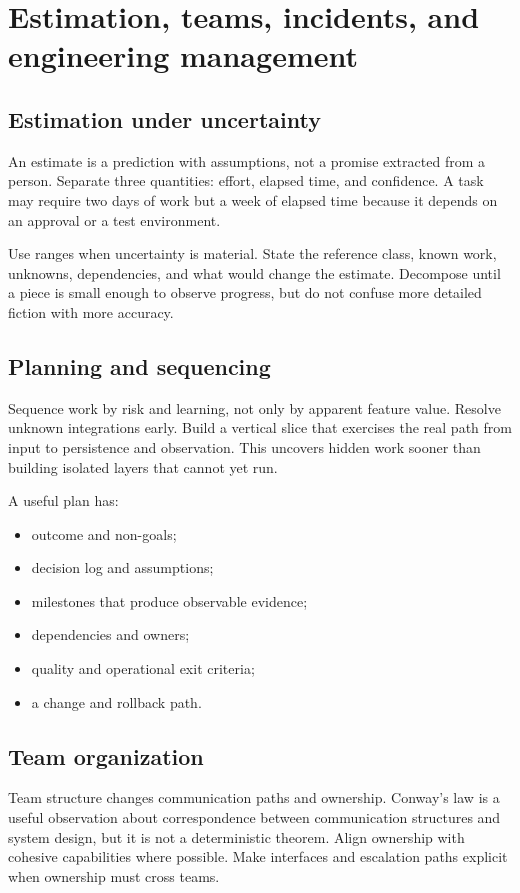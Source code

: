 \chapter{Estimation, teams, incidents, and engineering management}

\section{Estimation under uncertainty}
An estimate is a prediction with assumptions, not a promise extracted from a
person. Separate three quantities: effort, elapsed time, and confidence. A task
may require two days of work but a week of elapsed time because it depends on an
approval or a test environment.

Use ranges when uncertainty is material. State the reference class, known work,
unknowns, dependencies, and what would change the estimate. Decompose until a
piece is small enough to observe progress, but do not confuse more detailed
fiction with more accuracy.

\section{Planning and sequencing}
Sequence work by risk and learning, not only by apparent feature value. Resolve
unknown integrations early. Build a vertical slice that exercises the real path
from input to persistence and observation. This uncovers hidden work sooner than
building isolated layers that cannot yet run.

A useful plan has:

\begin{itemize}
  \item outcome and non-goals;
  \item decision log and assumptions;
  \item milestones that produce observable evidence;
  \item dependencies and owners;
  \item quality and operational exit criteria;
  \item a change and rollback path.
\end{itemize}

\section{Team organization}
Team structure changes communication paths and ownership. Conway's law is a
useful observation about correspondence between communication structures and
system design, but it is not a deterministic theorem. Align ownership with
cohesive capabilities where possible. Make interfaces and escalation paths
explicit when ownership must cross teams.

